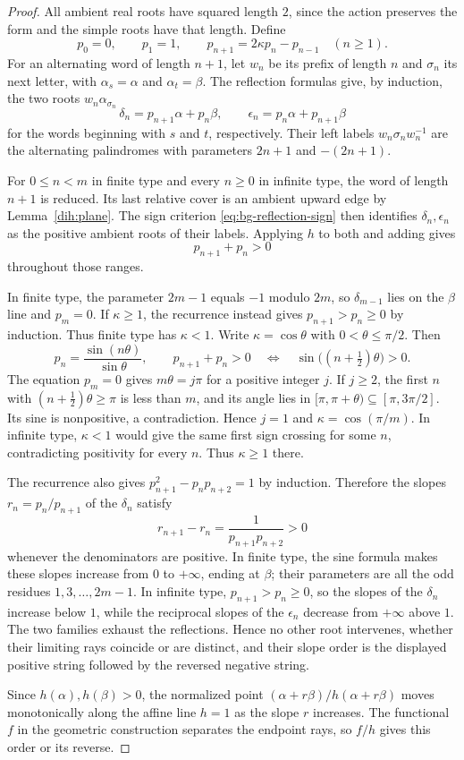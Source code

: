 \begin{proof}
All ambient real roots have squared length $2$, since the action preserves
the form and the simple roots have that length. Define
\[
 p_0=0,\qquad p_1=1,\qquad
 p_{n+1}=2\kappa p_n-p_{n-1}\quad(n\ge1).
\]
For an alternating word of length $n+1$, let $w_n$ be its prefix of length
$n$ and $\sigma_n$ its next letter, with $\alpha_s=\alpha$ and
$\alpha_t=\beta$. The reflection formulas give, by
induction, the two roots $w_n\alpha_{\sigma_n}$
\[
 \delta_n=p_{n+1}\alpha+p_n\beta,\qquad
 \epsilon_n=p_n\alpha+p_{n+1}\beta
\]
for the words beginning with $s$ and $t$, respectively. Their left labels
$w_n\sigma_nw_n^{-1}$ are the alternating palindromes with parameters
$2n+1$ and $-(2n+1)$.

For $0\le n<m$ in finite type and every $n\ge0$ in infinite type, the word
of length $n+1$ is reduced. Its last relative cover is an ambient upward
edge by Lemma~\ref{dih:plane}. The sign criterion
\eqref{eq:bg-reflection-sign} then identifies $\delta_n,\epsilon_n$ as the
positive ambient roots of their
labels. Applying $h$ to both and adding gives
\[
 p_{n+1}+p_n>0
\]
throughout those ranges.

In finite type, the parameter $2m-1$ equals $-1$ modulo $2m$, so
$\delta_{m-1}$ lies on the $\beta$ line and $p_m=0$. If $\kappa\ge1$, the
recurrence instead gives $p_{n+1}>p_n\ge0$ by induction. Thus finite type
has $\kappa<1$. Write $\kappa=\cos\theta$ with $0<\theta\le\pi/2$.
Then
\[
 p_n=\frac{\sin(n\theta)}{\sin\theta},
 \qquad
 p_{n+1}+p_n>0
 \quad\Longleftrightarrow\quad
 \sin\bigl((n+\tfrac12)\theta\bigr)>0.
\]
The equation $p_m=0$ gives $m\theta=j\pi$ for a positive integer $j$.
If $j\ge2$, the first $n$ with $(n+\tfrac12)\theta\ge\pi$ is less than
$m$, and its angle lies in $[\pi,\pi+\theta)\subseteq[\pi,3\pi/2]$.
Its sine is nonpositive, a contradiction. Hence $j=1$ and
$\kappa=\cos(\pi/m)$. In infinite type, $\kappa<1$ would give the same
first sign crossing for some $n$, contradicting positivity for every $n$.
Thus $\kappa\ge1$ there.

The recurrence also gives $p_{n+1}^2-p_np_{n+2}=1$ by induction. Therefore
the slopes $r_n=p_n/p_{n+1}$ of the $\delta_n$ satisfy
\[
 r_{n+1}-r_n=\frac{1}{p_{n+1}p_{n+2}}>0
\]
whenever the denominators are positive. In finite type, the sine formula
makes these slopes increase from $0$ to $+\infty$, ending at $\beta$;
their parameters are all the odd residues $1,3,\ldots,2m-1$. In infinite
type, $p_{n+1}>p_n\ge0$, so the slopes of the $\delta_n$ increase below
$1$, while the reciprocal slopes of the $\epsilon_n$ decrease from
$+\infty$ above $1$. The two families exhaust the reflections. Hence no
other root intervenes, whether their limiting rays coincide or are distinct,
and their slope order is the displayed positive string followed by the
reversed negative string.

Since $h(\alpha),h(\beta)>0$, the normalized point
$(\alpha+r\beta)/h(\alpha+r\beta)$ moves monotonically along the affine
line $h=1$ as the slope $r$ increases. The functional $f$ in the geometric
construction separates the endpoint rays, so $f/h$ gives this order or its
reverse.
\end{proof}

